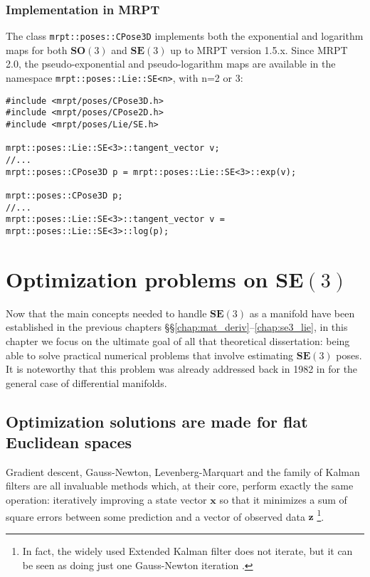 \documentclass[a4paper,11pt]{report}
\begin{document}
\subsection{Implementation in MRPT}

The class \texttt{mrpt::poses::CPose3D} implements both the exponential and logarithm
maps for both $\mathbf{SO}(3)$ and $\mathbf{SE}(3)$
up to MRPT version 1.5.x. Since MRPT 2.0, the pseudo-exponential and pseudo-logarithm 
maps are available in the namespace 
\texttt{mrpt::poses::Lie::SE<n>}, with n=2 or 3:

\begin{lstlisting}
#include <mrpt/poses/CPose3D.h>
#include <mrpt/poses/CPose2D.h>
#include <mrpt/poses/Lie/SE.h>

mrpt::poses::Lie::SE<3>::tangent_vector v;
//...
mrpt::poses::CPose3D p = mrpt::poses::Lie::SE<3>::exp(v);

mrpt::poses::CPose3D p;
//...
mrpt::poses::Lie::SE<3>::tangent_vector v = mrpt::poses::Lie::SE<3>::log(p);
\end{lstlisting}


\chapter{Optimization problems on $\mathbf{SE}(3)$}
\label{ch:se3_optim}

Now that the main concepts needed to handle $\mathbf{SE}(3)$
as a manifold have been established in
the previous chapters \S\S\ref{chap:mat_deriv}--\ref{chap:se3_lie},
in this chapter we focus on the ultimate goal of all that theoretical
dissertation: being able to solve practical numerical
problems that involve
estimating $\mathbf{SE}(3)$ poses.
It is noteworthy that this problem was already addressed back in 1982 in \cite{gabay1982mdf} for the general case of differential manifolds.


\section{Optimization solutions are made for flat Euclidean spaces}

Gradient descent, Gauss-Newton, Levenberg-Marquart and the family of Kalman
filters are all
invaluable methods which, at their core, perform exactly the same operation:
iteratively improving a state vector $\mathbf{x}$ so that it minimizes
a sum of square errors between some prediction and a vector of observed data $\mathbf{z}$
\footnote{In fact, the widely used Extended Kalman filter does not iterate,
but it can be seen as doing just one Gauss-Newton iteration \cite{bell1993ikf}.}.
\end{document}
